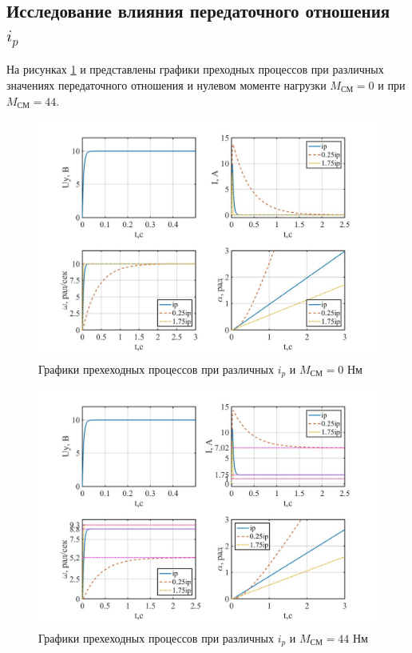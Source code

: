 \documentclass[a4paper, 12pt]{article}
\begin{document}
\newpage
\begin{center}
	\section{Исследование влияния передаточного отношения $i_p$}
\end{center}\par
На рисунках \ref{ipm0} и представлены графики преходных процессов при различных значениях передаточного отношения и нулевом моменте нагрузки $M_\text{СМ} = 0$ и при $M_\text{СМ} = 44$.

\begin{figure}[h!]
	\centering
	\includegraphics[width = 1\textwidth]{data/ipm0}
	\caption{Графики прехеходных процессов при различных $i_p$ и $M_\text{СМ} = 0$ Нм}
	\label{ipm0}
\end{figure}
\newpage
\begin{figure}[h!]
	\centering
	\includegraphics[width = 1\textwidth]{data/ipm44}
	\caption{Графики прехеходных процессов при различных $i_p$ и $M_\text{СМ} = 44$ Нм}
	\label{ipm44}
\end{figure}
\newpage
\end{document}
